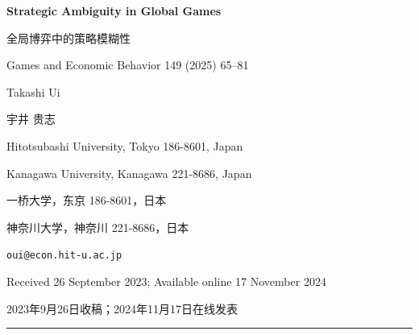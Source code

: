 \documentclass[12pt,a4paper]{article}
\theoremstyle{definition}
\theoremstyle{remark}
\begin{document}
{\LARGE\bfseries Strategic Ambiguity in Global Games\par}
\vspace{4pt}
{\Large\color{darkblue}\qquad\qquad 全局博弈中的策略模糊性\par}
\vspace{4pt}
{\normalsize Games and Economic Behavior 149 (2025) 65--81\par}
\vspace{16pt}

{\large Takashi Ui\par}
{\small\color{darkblue}宇井 贵志\par}
\vspace{4pt}
{\small Hitotsubashi University, Tokyo 186-8601, Japan\par}
{\small Kanagawa University, Kanagawa 221-8686, Japan\par}
{\small\color{darkblue}一桥大学，东京 186-8601，日本\par}
{\small\color{darkblue}神奈川大学，神奈川 221-8686，日本\par}
\vspace{4pt}
\texttt{oui@econ.hit-u.ac.jp}
\vspace{8pt}

{\small Received 26 September 2023; Available online 17 November 2024\par}
{\small\color{darkblue}2023年9月26日收稿；2024年11月17日在线发表\par}
\vspace{12pt}
\hrule
\vspace{12pt}
\end{document}
